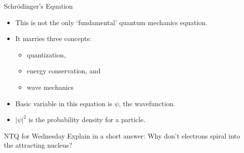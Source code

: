 \documentclass[english]{beamer}
\begin{document}
\begin{frame}{Schr{\"o}dinger's Equation}
  \begin{itemize}
    \item This is not the only `fundamental' quantum mechanics equation.
    \item It marries three concepts:
    \begin{itemize}
      \item quantization,
      \item energy conservation, and
      \item wave mechanics
    \end{itemize}
    \item Basic variable in this equation is $\psi$, the wavefunction.
    \item $\left|\psi\right|^2$ is the probability density for a particle. 
  \end{itemize}
\end{frame}

\begin{frame}{NTQ for Wednesday}
  Explain in a short answer: Why don't electrons spiral into the attracting nucleus?
\end{frame}
\end{document}
